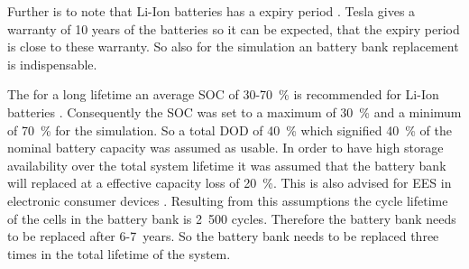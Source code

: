 Further is to note that Li-Ion batteries has a expiry period \cite{Jossen2006}. Tesla gives a warranty of 10 years of the batteries \cite{Shahan2015} so it can be expected, that the expiry period is close to these warranty. So also for the simulation an battery bank replacement is indispensable.



The for a long lifetime an average SOC of 30-70~\% is recommended for Li-Ion batteries \cite{Jossen2006}. Consequently the SOC was set to a maximum of 30~\% and a minimum of 70~\% for the simulation. So a total DOD of 40~\% which signified 40~\% of the nominal battery capacity was assumed as usable. In order to have high storage availability over the total system lifetime it was assumed that the battery bank will replaced at a effective capacity loss of 20~\%. This is also advised for EES in electronic consumer devices \cite{Spotnitz2003}. Resulting from this assumptions the cycle lifetime of the cells in the battery bank is 2~500 cycles. Therefore the battery bank needs to be replaced after 6-\SI{7}{years}. So the battery bank needs to be replaced three times in the total lifetime of the system. 




